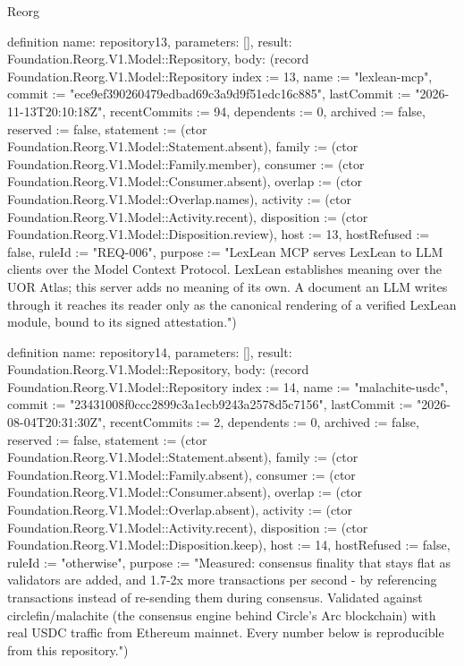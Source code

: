 \begin{lexlean}{Reorg}
\begin{semanticmodule}
definition{
  name: repository13,
  parameters: [],
  result: Foundation.Reorg.V1.Model::Repository,
  body: (record Foundation.Reorg.V1.Model::Repository {index := 13, name := "lexlean-mcp", commit := "ece9ef390260479edbad69c3a9d9f51edc16c885", lastCommit := "2026-11-13T20:10:18Z", recentCommits := 94, dependents := 0, archived := false, reserved := false, statement := (ctor Foundation.Reorg.V1.Model::Statement.absent), family := (ctor Foundation.Reorg.V1.Model::Family.member), consumer := (ctor Foundation.Reorg.V1.Model::Consumer.absent), overlap := (ctor Foundation.Reorg.V1.Model::Overlap.names), activity := (ctor Foundation.Reorg.V1.Model::Activity.recent), disposition := (ctor Foundation.Reorg.V1.Model::Disposition.review), host := 13, hostRefused := false, ruleId := "REQ-006", purpose := "LexLean MCP serves LexLean to LLM clients over the Model Context Protocol. LexLean establishes meaning over the UOR Atlas; this server adds no meaning of its own. A document an LLM writes through it reaches its reader only as the canonical rendering of a verified LexLean module, bound to its signed attestation."})
}

definition{
  name: repository14,
  parameters: [],
  result: Foundation.Reorg.V1.Model::Repository,
  body: (record Foundation.Reorg.V1.Model::Repository {index := 14, name := "malachite-usdc", commit := "23431008f0ccc2899c3a1ecb9243a2578d5c7156", lastCommit := "2026-08-04T20:31:30Z", recentCommits := 2, dependents := 0, archived := false, reserved := false, statement := (ctor Foundation.Reorg.V1.Model::Statement.absent), family := (ctor Foundation.Reorg.V1.Model::Family.absent), consumer := (ctor Foundation.Reorg.V1.Model::Consumer.absent), overlap := (ctor Foundation.Reorg.V1.Model::Overlap.absent), activity := (ctor Foundation.Reorg.V1.Model::Activity.recent), disposition := (ctor Foundation.Reorg.V1.Model::Disposition.keep), host := 14, hostRefused := false, ruleId := "otherwise", purpose := "Measured: consensus finality that stays flat as validators are added, and 1.7-2x more transactions per second - by referencing transactions instead of re-sending them during consensus. Validated against circlefin/malachite (the consensus engine behind Circle's Arc blockchain) with real USDC traffic from Ethereum mainnet. Every number below is reproducible from this repository."})
}


\end{semanticmodule}
\end{lexlean}
